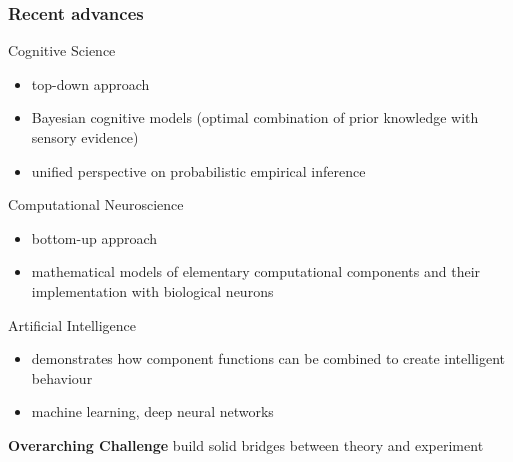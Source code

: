 \documentclass[
t, %
10pt, %
aspectratio=1610, %
ngerman,
english,
]{beamer}
\begin{document}
\begin{frame}
    \frametitle{Recent advances}
    Cognitive Science
    \begin{itemize}
     \item top-down approach
     \item Bayesian cognitive models (optimal combination of prior knowledge with sensory evidence)
     \item unified perspective on probabilistic empirical inference
    \end{itemize}
    Computational Neuroscience
    \begin{itemize}
     \item bottom-up approach
     \item mathematical models of elementary computational components and their implementation with biological neurons
    \end{itemize}
    Artificial Intelligence
    \begin{itemize}
     \item demonstrates how component functions can be combined to create intelligent behaviour
     \item machine learning, deep neural networks
    \end{itemize}
    
    \textbf{Overarching Challenge}
    build solid bridges between theory and experiment
\end{frame}
\end{document}
